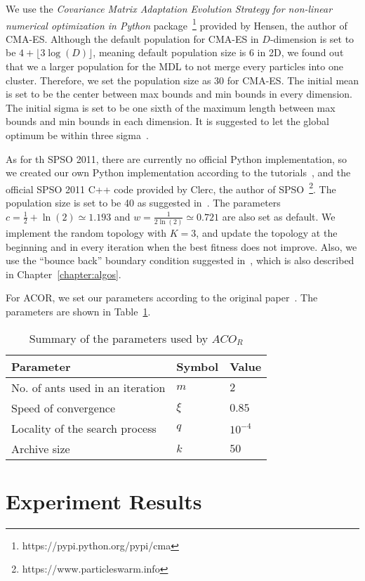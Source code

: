 We use the \textit{Covariance Matrix Adaptation Evolution Strategy for non-linear numerical optimization in Python} package~\footnote{https://pypi.python.org/pypi/cma} provided by Hensen, the author of CMA-ES.
Although the default population for CMA-ES in $D$-dimension is set to be $4 + \lfloor3\log(D)\rfloor$, meaning default population size is 6 in 2D,
we found out that we a larger population for the MDL to not merge every particles into one cluster.
Therefore, we set the population size as 30 for CMA-ES.
The initial mean is set to be the center between max bounds and min bounds in every dimension.
The initial sigma is set to be one sixth of the maximum length between max bounds and min bounds in each dimension. 
It is suggested to let the global optimum be within three sigma~\cite{Hansen:2006:CMA_ES_review}.

As for th SPSO 2011, there are currently no official Python implementation, 
so we created our own Python implementation according to the tutorials~\cite{Clerc:2012:SPSO2011},
and the official SPSO 2011 C++ code provided by Clerc, the author of SPSO~\footnote{https://www.particleswarm.info}.
The population size is set to be 40 as suggested in~\cite{Clerc:2012:SPSO2011}.
The parameters $c = \frac{1}{2} + \ln(2) \simeq 1.193$ and $w = \frac{1}{2\ln(2)} \simeq 0.721$ are also set as default.
We implement the random topology with $K = 3$,
and update the topology at the beginning and in every iteration when the best fitness does not improve.
Also, we use the ``bounce back'' boundary condition suggested in~\cite{Clerc:2012:SPSO2011}, which is also described in Chapter~\ref{chapter:algos}.

For ACOR, we set our parameters according to the original paper~\cite{Socha:2008:ACOR}. 
The parameters are shown in Table~\ref{table:ACOR_parameters}.

\begin{table}%
\centering
\label{table:ACOR_parameters}
\begin{tabular}{lll}
\hline
Parameter                        & Symbol   & Value          \\ \hline
No. of ants used in an iteration & $m$      & $2$            \\
Speed of convergence             & $\xi$    & $0.85$         \\
Locality of the search process   & $q$      & $10^{-4}$      \\
Archive size                     & $k$      & $50$           \\ \hline
\end{tabular}
\caption{Summary of the parameters used by $ACO_R$}
\end{table}


\section{Experiment Results}
